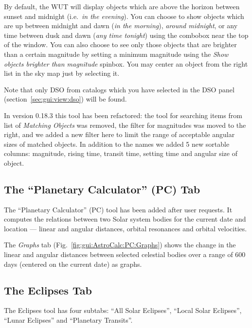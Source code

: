 By default, the WUT will display objects which are above the horizon between sunset and midnight (i.e.\ \emph{in the evening}). 
You can choose to show objects which are up between midnight and dawn (\emph{in the morning}), 
\emph{around midnight}, 
or any time between dusk and dawn (\emph{any time tonight}) using the combobox near the top of the window. 
You can also choose to see only those objects that are brighter than a certain magnitude by 
setting a minimum magnitude using the \emph{Show objects brighter than magnitude} spinbox. 
You may center an object from the right list in the sky map just by selecting it.

Note that only DSO from catalogs which you have selected in the DSO panel (section~\ref{sec:gui:view:dso}) will be found.

In version 0.18.3  this tool has been refactored: the tool for searching items from list of \emph{Matching Objects} was removed,
the filter for magnitudes was moved to the right, and we added a new filter here to limit the range of acceptable angular sizes of matched objects.
In addition to the names we added 5 new sortable columns: magnitude, rising time, transit time, setting time and angular size of object.



\subsection{The ``Planetary Calculator'' (PC) Tab}
\label{sec:gui:AstroCalc:PC}

The ``Planetary Calculator'' (PC) tool has been added after user requests. 
It computes the relations between two Solar system bodies for the current date and location --- linear and angular distances, 
orbital resonances and orbital velocities.

The \emph{Graphs} tab (Fig.~\ref{fig:gui:AstroCalc:PC:Graphs})
shows the change in the linear and angular distances between
selected celestial bodies over a range of 600 days (centered on the
current date) as graphs.


\subsection{The Eclipses Tab}
\label{sec:gui:AstroCalc:Eclipses}

The Eclipses tool has four subtabs: ``All Solar Eclipses'', ``Local Solar Eclipses'', ``Lunar Eclipses'' and ``Planetary Transits''. 

